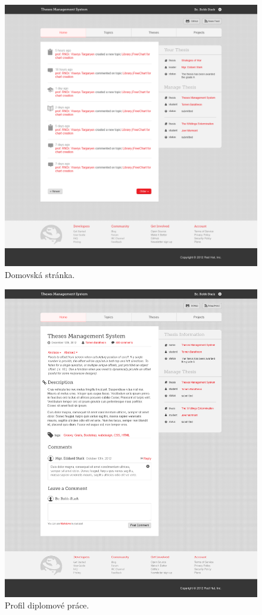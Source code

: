 \begin{figure}[htbp]
    \centering
    \includegraphics[width=\textwidth]{images/gd2.png}
    \caption{Domovská stránka.}
    \label{img:layout1}
\end{figure}

\begin{figure}[htbp]
    \centering
    \includegraphics[width=\textwidth]{images/gd1.png}
    \caption{Profil diplomové práce.}
    \label{img:layout1}
\end{figure}

